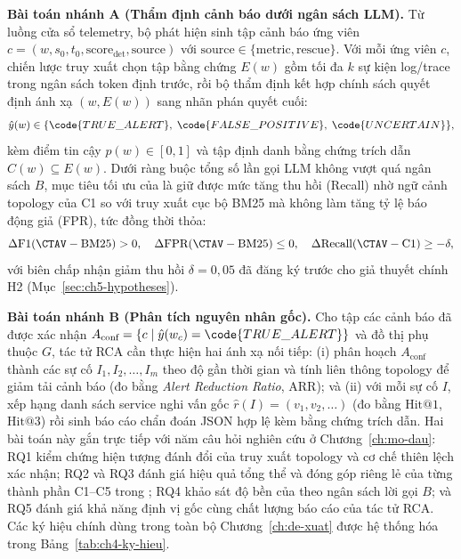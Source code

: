 \textbf{Bài toán nhánh A (Thẩm định cảnh báo dưới ngân sách LLM).} Từ luồng cửa sổ telemetry, bộ phát hiện sinh tập cảnh báo ứng viên $c = (w, s_0, t_0, \text{score}_{\text{det}}, \text{source})$ với $\text{source} \in \{\text{metric}, \text{rescue}\}$. Với mỗi ứng viên $c$, chiến lược truy xuất chọn tập bằng chứng $E(w)$ gồm tối đa $k$ sự kiện log/trace trong ngân sách token định trước, rồi bộ thẩm định kết hợp chính sách quyết định ánh xạ $(w, E(w))$ sang nhãn phán quyết cuối:
\begin{equation}
  \hat{y}(w) \in \{\code{TRUE\_ALERT},\; \code{FALSE\_POSITIVE},\; \code{UNCERTAIN}\},
  \label{eq:ch4-verdict-space}
\end{equation}
kèm điểm tin cậy $p(w) \in [0, 1]$ và tập định danh bằng chứng trích dẫn $C(w) \subseteq E(w)$. Dưới ràng buộc tổng số lần gọi LLM không vượt quá ngân sách $B$, mục tiêu tối ưu của \CTAV{} là giữ được mức tăng thu hồi (Recall) nhờ ngữ cảnh topology của C1 so với truy xuất cục bộ BM25 mà không làm tăng tỷ lệ báo động giả (FPR), tức đồng thời thỏa:
\begin{equation}
  \Delta\text{F1}(\text{\CTAV} - \text{BM25}) > 0, \quad
  \Delta\text{FPR}(\text{\CTAV} - \text{BM25}) \le 0, \quad
  \Delta\text{Recall}(\text{\CTAV} - \text{C1}) \ge -\delta,
  \label{eq:ch4-ctav-objective}
\end{equation}
với biên chấp nhận giảm thu hồi $\delta = 0{,}05$ đã đăng ký trước cho giả thuyết chính H2 (Mục~\ref{sec:ch5-hypotheses}).

\textbf{Bài toán nhánh B (Phân tích nguyên nhân gốc).} Cho tập các cảnh báo đã được \CTAV{} xác nhận $A_{\text{conf}} = \{c \mid \hat{y}(w_c) = \code{TRUE\_ALERT}\}$ và đồ thị phụ thuộc $G$, tác tử RCA cần thực hiện hai ánh xạ nối tiếp: (i) phân hoạch $A_{\text{conf}}$ thành các sự cố $I_1, I_2, \dots, I_m$ theo độ gần thời gian và tính liên thông topology để giảm tải cảnh báo (đo bằng \emph{Alert Reduction Ratio}, ARR); và (ii) với mỗi sự cố $I$, xếp hạng danh sách service nghi vấn gốc $\hat{r}(I) = (v_1, v_2, \dots)$ (đo bằng $\text{Hit}@1$, $\text{Hit}@3$) rồi sinh báo cáo chẩn đoán JSON hợp lệ kèm bằng chứng trích dẫn. Hai bài toán này gắn trực tiếp với năm câu hỏi nghiên cứu ở Chương~\ref{ch:mo-dau}: RQ1 kiểm chứng hiện tượng đánh đổi của truy xuất topology và cơ chế thiên lệch xác nhận; RQ2 và RQ3 đánh giá hiệu quả tổng thể và đóng góp riêng lẻ của từng thành phần C1--C5 trong \CTAV{}; RQ4 khảo sát độ bền của \CTAV{} theo ngân sách lời gọi $B$; và RQ5 đánh giá khả năng định vị gốc cùng chất lượng báo cáo của tác tử RCA. Các ký hiệu chính dùng trong toàn bộ Chương~\ref{ch:de-xuat} được hệ thống hóa trong Bảng~\ref{tab:ch4-ky-hieu}.

